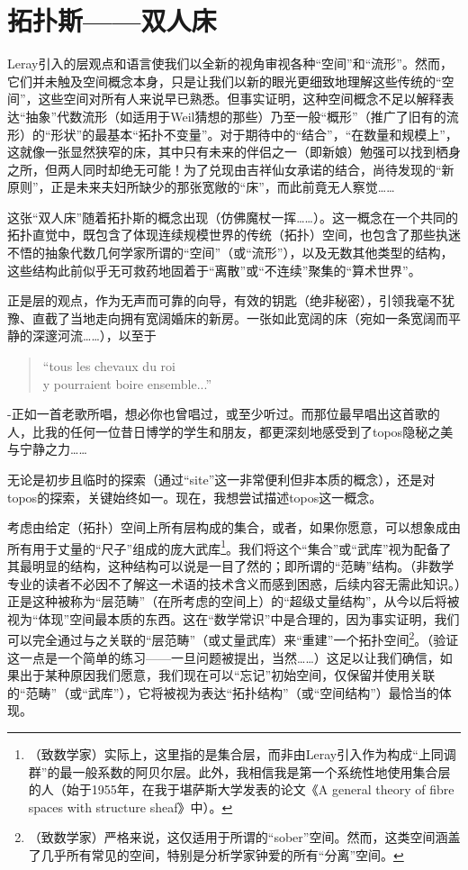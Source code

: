 
\section{拓扑斯——双人床}

Leray引入的层观点和语言使我们以全新的视角审视各种“空间”和“流形”。然而，它们并未触及空间概念本身，只是让我们以新的眼光更细致地理解这些传统的“空间”，这些空间对所有人来说早已熟悉。但事实证明，这种空间概念不足以解释表达“抽象”代数流形（如适用于Weil猜想的那些）乃至一般“概形”（推广了旧有的流形）的“形状”的最基本“拓扑不变量”。对于期待中的“结合”，“在数量和规模上”，这就像一张显然狭窄的床，其中只有未来的伴侣之一（即新娘）勉强可以找到栖身之所，但两人同时却绝无可能！为了兑现由吉祥仙女承诺的结合，尚待发现的“新原则”，正是未来夫妇所缺少的那张宽敞的“床”，而此前竟无人察觉……

这张“双人床”随着拓扑斯的概念出现（仿佛魔杖一挥……）。这一概念在一个共同的拓扑直觉中，既包含了体现连续规模世界的传统（拓扑）空间，也包含了那些执迷不悟的抽象代数几何学家所谓的“空间”（或“流形”），以及无数其他类型的结构，这些结构此前似乎无可救药地固着于“离散”或“不连续”聚集的“算术世界”。

正是层的观点，作为无声而可靠的向导，有效的钥匙（绝非秘密），引领我毫不犹豫、直截了当地走向拥有宽阔婚床的新房。一张如此宽阔的床（宛如一条宽阔而平静的深邃河流……），以至于
\begin{quote}
    ``tous les chevaux du roi\\
    y pourraient boire ensemble...''
    \end{quote}-正如一首老歌所唱，想必你也曾唱过，或至少听过。而那位最早唱出这首歌的人，比我的任何一位昔日博学的学生和朋友，都更深刻地感受到了topos隐秘之美与宁静之力……

无论是初步且临时的探索（通过“site”这一非常便利但非本质的概念），还是对topos的探索，关键始终如一。现在，我想尝试描述topos这一概念。

考虑由给定（拓扑）空间上所有层构成的集合，或者，如果你愿意，可以想象成由所有用于丈量的“尺子”组成的庞大武库\footnote{（致数学家）实际上，这里指的是集合层，而非由Leray引入作为构成“上同调群”的最一般系数的阿贝尔层。此外，我相信我是第一个系统性地使用集合层的人（始于1955年，在我于堪萨斯大学发表的论文《A general theory of fibre spaces with structure sheaf》中）。}。我们将这个“集合”或“武库”视为配备了其最明显的结构，这种结构可以说是一目了然的；即所谓的“范畴”结构。（非数学专业的读者不必因不了解这一术语的技术含义而感到困惑，后续内容无需此知识。）正是这种被称为“层范畴”（在所考虑的空间上）的“超级丈量结构”，从今以后将被视为“体现”空间最本质的东西。这在“数学常识”中是合理的，因为事实证明，我们可以完全通过与之关联的“层范畴”（或丈量武库）来“重建”一个拓扑空间\footnote{（致数学家）严格来说，这仅适用于所谓的“sober”空间。然而，这类空间涵盖了几乎所有常见的空间，特别是分析学家钟爱的所有“分离”空间。}。（验证这一点是一个简单的练习——一旦问题被提出，当然……）这足以让我们确信，如果出于某种原因我们愿意，我们现在可以“忘记”初始空间，仅保留并使用关联的“范畴”（或“武库”），它将被视为表达“拓扑结构”（或“空间结构”）最恰当的体现。

